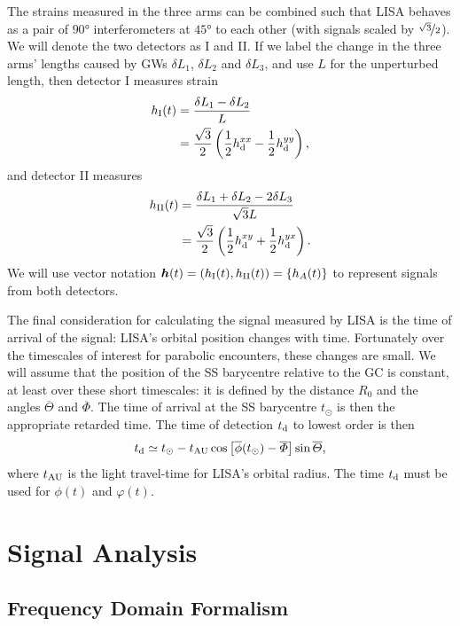 The strains measured in the three arms can be combined such that LISA behaves as a pair of $\ang{90}$ interferometers at $\ang{45}$ to each other (with signals scaled by $\nicefrac{\sqrt{3}}{2}$)\cite{Cutler1998}. We will denote the two detectors as I and II. If we label the change in the three arms' lengths caused by GWs $\delta L_1$, $\delta L_2$ and $\delta L_3$, and use $L$ for the unperturbed length, then detector I measures strain
\begin{align}
h_\mathrm{I}(t) = {} & \frac{\delta L_1 - \delta L_2}{L} \\
 = {} & \frac{\sqrt{3}}{2}\left(\frac{1}{2} h_\mathrm{d}^{xx} - \frac{1}{2}h_\mathrm{d}^{yy}\right),
\end{align}
and detector II measures
\begin{align}
h_\mathrm{II}(t) = {} & \frac{\delta L_1 + \delta L_2 - 2 \delta L_3}{\sqrt{3}L} \\
 = {} & \frac{\sqrt{3}}{2}\left(\frac{1}{2} h_\mathrm{d}^{xy} + \frac{1}{2} h_\mathrm{d}^{yx}\right).
\end{align}
We will use vector notation $\boldsymbol{h}(t) = \left(h_\mathrm{I}(t), h_\mathrm{II}(t)\right) = \left\{h_A(t)\right\}$ to represent signals from both detectors.

The final consideration for calculating the signal measured by LISA is the time of arrival of the signal: LISA's orbital position changes with time. Fortunately over the timescales of interest for parabolic encounters, these changes are small. We will assume that the position of the SS barycentre relative to the GC is constant, at least over these short timescales: it is defined by the distance $R_0$ and the angles $\overline{\Theta}$ and $\overline{\Phi}$. The time of arrival at the SS barycentre $t_\odot$ is then the appropriate retarded time. The time of detection $t_\mathrm{d}$ to lowest order is then
\begin{equation}
t_\mathrm{d} \simeq t_\odot - t_\mathrm{AU}\cos\left[\overline{\phi}(t_\odot) - \overline{\Phi}\right]\sin\overline{\Theta},
\end{equation}
where $t_\mathrm{AU}$ is the light travel-time for LISA's orbital radius. The time $t_\mathrm{d}$ must be used for $\phi(t)$ and $\varphi(t)$.

\section{Signal Analysis}

\subsection{Frequency Domain Formalism}

